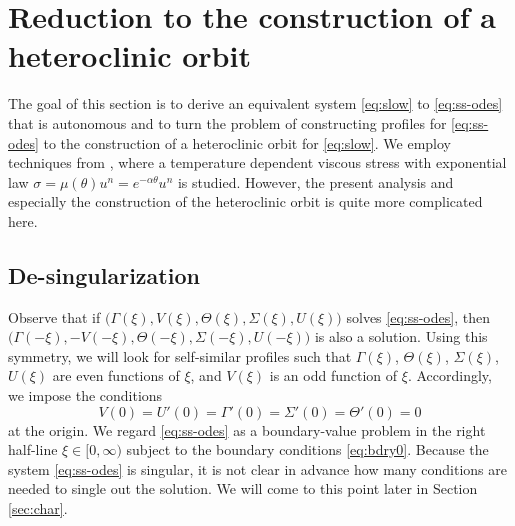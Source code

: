 \documentclass[a4paper,11pt]{article}
\theoremstyle{remark}
\begin{document}
\vfil\eject

\section{Reduction to the construction of a heteroclinic orbit} \label{sec:formulation}
The goal of this section is to derive an equivalent system \eqref{eq:slow} to \eqref{eq:ss-odes} that is autonomous and to turn the problem of
constructing profiles for \eqref{eq:ss-odes} to the construction of a heteroclinic orbit for \eqref{eq:slow}. We employ techniques from \cite{KOT14}, where
a temperature dependent viscous stress with exponential law $ \sigma = \mu(\theta)u^n = e^{-\alpha\theta} u^n$ is studied. However, the present
analysis and especially the construction of the heteroclinic orbit is quite more complicated here.


\subsection{De-singularization}
Observe that if $\big(\Gamma(\xi), V(\xi), \Theta(\xi), \Sigma(\xi), U(\xi)\big)$ solves \eqref{eq:ss-odes}, then 
$\big(\Gamma(-\xi), -V(-\xi), \Theta(-\xi), \Sigma(-\xi), U(-\xi)\big)$ is also a solution. 
Using this symmetry, we will look for self-similar profiles such that $\Gamma(\xi)$, $\Theta(\xi)$, $\Sigma(\xi)$, $U(\xi)$ are even functions of $\xi$, and $V(\xi)$ is an odd function of $\xi$. Accordingly, we impose the conditions
\begin{equation}
 V(0)=U'(0)=\Gamma'(0)=\Sigma'(0)=\Theta'(0)=0 \label{eq:bdry0}
\end{equation}
at the origin. We regard \eqref{eq:ss-odes} as a boundary-value problem in the right half-line $\xi \in [0,\infty)$ subject to the boundary conditions \eqref{eq:bdry0}. Because the system \eqref{eq:ss-odes} is singular, it is not clear in advance how many conditions are needed to single out the solution. We will come to this point later in Section \ref{sec:char}.%
\end{document}
